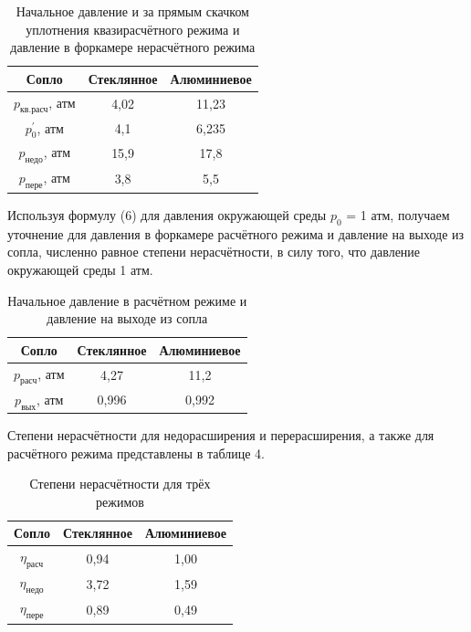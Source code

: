 \documentclass[a4paper]{article}
\begin{document}
\begin{table}[H]
\centering
\begin{tabular}{|c||c|c|}
\hline
Сопло & Стеклянное & Алюминиевое\\ \hline
$p_{\text{кв.расч}}$, атм	&4,02	&11,23   \\ \hline
$ p_{0}^{'} $, атм	&4,1	&6,235	 \\ \hline
$ p_{\text{недо}} $, атм	&15,9	&17,8	 \\ \hline
$ p_{\text{пере}} $, атм	&3,8	&5,5	 \\ \hline
\end{tabular}
\caption{Начальное давление и за прямым скачком уплотнения квазирасчётного режима и давление в форкамере нерасчётного режима}
\end{table}



Используя формулу (6) для давления окружающей среды $p_0$ = 1 атм, получаем уточнение для давления в форкамере расчётного режима и давление на выходе из сопла, численно равное степени нерасчётности, в силу того, что давление окружающей среды 1 атм.

\begin{table}[H]
\centering
\begin{tabular}{|c||c|c|}
\hline
Сопло & Стеклянное & Алюминиевое\\ \hline
$ p_{\text{расч}} $, атм	&4,27	&11,2	 \\ \hline
$p_\text{вых}$, атм	&0,996	&0,992   \\ \hline
\end{tabular}
\caption{Начальное давление в расчётном режиме и давление на выходе из сопла}
\end{table}

Степени нерасчётности для недорасширения и перерасширения, а также для расчётного режима представлены в таблице 4.


\begin{table}[H]
\centering
\begin{tabular}{|c||c|c|}
\hline
Сопло & Стеклянное & Алюминиевое\\ \hline
$\eta_\text{расч}$ & 0,94 & 1,00 \\ \hline
$\eta_\text{недо}$ & 3,72 & 1,59 \\ \hline
$\eta_\text{пере}$ & 0,89 & 0,49 \\ \hline
\end{tabular}
\caption{Степени нерасчётности для трёх режимов}
\end{table}
\end{document}
